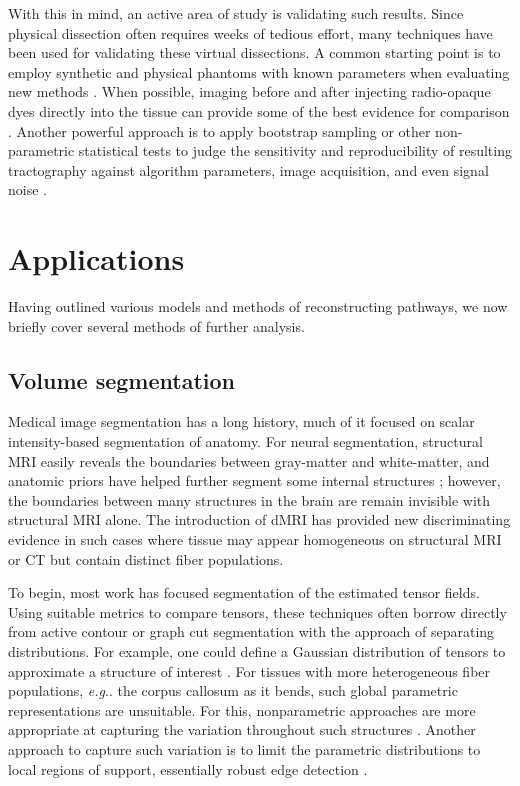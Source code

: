 \documentclass[final,hyperref]{gatech-thesis}
\makeatletter
\DeclareRobustCommand\onedot{\futurelet\@let@token\@onedot}
\def\@onedot{\ifx\@let@token.\else.\null\fi\xspace}
\newcommand{\eg}{\textit{e.g}\onedot}
\makeatother
\begin{document}
With this in mind, an active area of study is validating such results.  Since
physical dissection often requires weeks of tedious effort, many techniques
have been used for validating these virtual dissections.
%
A common starting point is to employ synthetic and physical phantoms with
known parameters when evaluating new methods \cite{Poupon2008phantom}.
%
When possible, imaging before and after injecting radio-opaque dyes directly
into the tissue can provide some of the best evidence for comparison
\cite{Lin2003,Dauguet2007}.
%
Another powerful approach is to apply bootstrap sampling or other
non-parametric statistical tests to judge the sensitivity and reproducibility
of resulting tractography against algorithm parameters, image acquisition, and
even signal noise
\cite{Lazar2005,Jones2005,Gigandet2008,Whitcher2008,Chung2006,Clayden2007}.


\section{Applications} \label{sec:applications}

Having outlined various models and methods of reconstructing pathways, we now
briefly cover several methods of further analysis.

\subsection{Volume segmentation}

Medical image segmentation has a long history, much of it focused on scalar
intensity-based segmentation of anatomy.  For neural segmentation, structural
MRI easily reveals the boundaries between gray-matter and white-matter, and
anatomic priors have helped further segment some internal structures
\cite{Pohl2007ipmi}; however, the boundaries between many structures in the
brain are remain invisible with structural MRI alone.  The introduction of
dMRI has provided new discriminating evidence in such cases where tissue may
appear homogeneous on structural MRI or CT but contain distinct fiber
populations.

To begin, most work has focused segmentation of the estimated tensor fields.
Using suitable metrics to compare tensors, these techniques often borrow
directly from active contour or graph cut segmentation with the approach of
separating distributions.
%
For example, one could define a Gaussian distribution of tensors to
approximate a structure of interest \cite{Rousson2004,deLuis-Garcia2007}.
%
For tissues with more heterogeneous fiber populations, \eg the corpus callosum
as it bends, such global parametric representations are unsuitable.  For this,
nonparametric approaches are more appropriate at capturing the variation
throughout such structures \cite{Rathi2007,Malcolm2007tc}.
%
Another approach to capture such variation is to limit the parametric
distributions to local regions of support, essentially robust edge detection
\cite{Lankton2008mmbia}.
\end{document}
